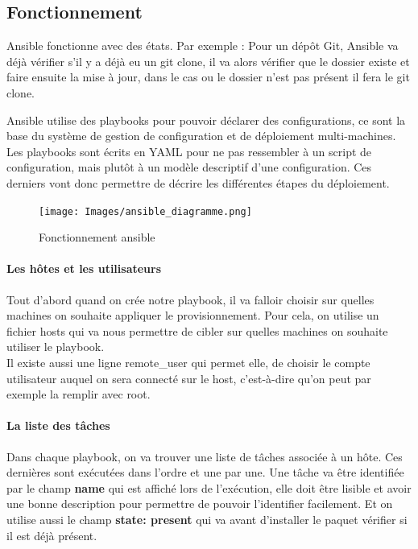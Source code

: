 \documentclass[]{article}
\let\oldparagraph\paragraph
\renewcommand{\paragraph}[1]{\oldparagraph{#1}\mbox{}}
\begin{document}
\subsection{Fonctionnement}\label{fonctionnement-1}

Ansible fonctionne avec des états.
Par exemple :
Pour un dépôt Git, Ansible va déjà vérifier s'il y a déjà eu un git clone, il va alors vérifier que le dossier existe et faire ensuite la mise à jour, dans le cas ou le dossier n'est pas présent il fera le git clone.

Ansible utilise des playbooks pour pouvoir déclarer des configurations,
ce sont la base du système de gestion de configuration et de déploiement
multi-machines. Les playbooks sont écrits en YAML pour ne pas ressembler
à un script de configuration, mais plutôt à un modèle descriptif d'une
configuration. Ces derniers vont donc permettre de décrire les différentes étapes du déploiement.

\begin{figure}
\centering
\texttt{[image: Images/ansible\_diagramme.png]}
\caption{Fonctionnement ansible}
\end{figure}


\paragraph{Les hôtes et les utilisateurs}\label{les-huxf4tes-et-les-utilisateurs}

Tout d'abord quand on crée notre playbook, il va falloir choisir sur
quelles machines on souhaite appliquer le provisionnement. Pour cela, on
utilise un fichier hosts qui va nous permettre de cibler sur quelles
machines on souhaite utiliser le playbook.\\
 Il existe aussi une ligne remote\_user qui permet elle, de choisir le compte utilisateur auquel
on sera connecté sur le host, c'est-à-dire qu'on peut par exemple la
remplir avec root.

\paragraph{La liste des tâches}\label{la-liste-des-tuxe2ches}

Dans chaque playbook, on va trouver une liste de tâches associée à un
hôte. Ces dernières sont exécutées dans l'ordre et une par une. Une
tâche va être identifiée par le champ \textbf{name} qui est affiché lors de
l'exécution, elle doit être lisible et avoir une bonne description pour
permettre de pouvoir l'identifier facilement.
Et on utilise aussi le champ \textbf{state: present} qui va avant d'installer le paquet vérifier si il est déjà présent.
\end{document}
